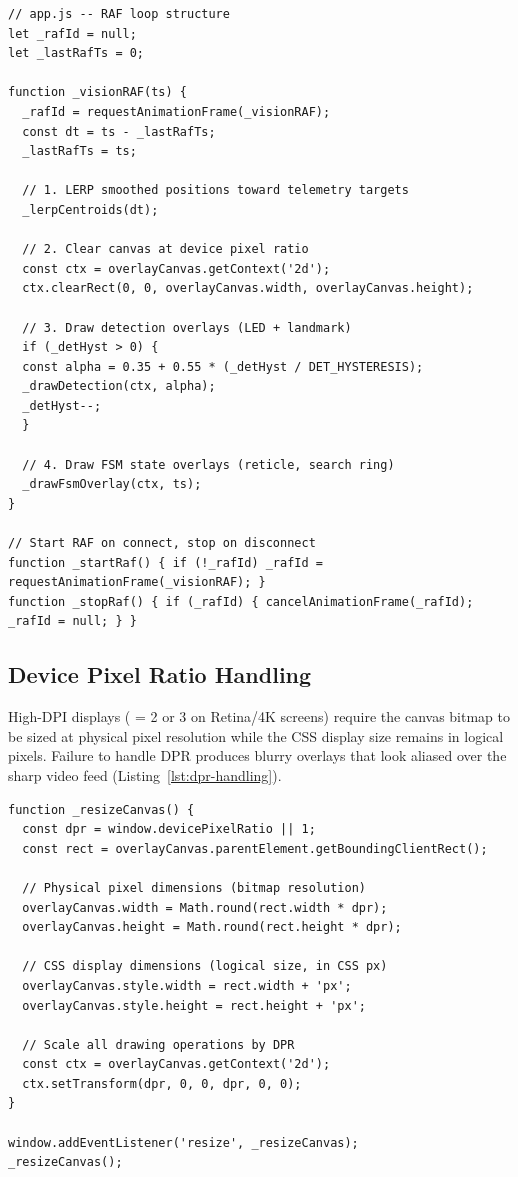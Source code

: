 \begin{lstlisting}[caption={RAF loop structure decoupled from telemetry rate}, label={lst:raf-loop}]
// app.js -- RAF loop structure
let _rafId = null;
let _lastRafTs = 0;

function _visionRAF(ts) {
  _rafId = requestAnimationFrame(_visionRAF);
  const dt = ts - _lastRafTs;
  _lastRafTs = ts;

  // 1. LERP smoothed positions toward telemetry targets
  _lerpCentroids(dt);

  // 2. Clear canvas at device pixel ratio
  const ctx = overlayCanvas.getContext('2d');
  ctx.clearRect(0, 0, overlayCanvas.width, overlayCanvas.height);

  // 3. Draw detection overlays (LED + landmark)
  if (_detHyst > 0) {
  const alpha = 0.35 + 0.55 * (_detHyst / DET_HYSTERESIS);
  _drawDetection(ctx, alpha);
  _detHyst--;
  }

  // 4. Draw FSM state overlays (reticle, search ring)
  _drawFsmOverlay(ctx, ts);
}

// Start RAF on connect, stop on disconnect
function _startRaf() { if (!_rafId) _rafId = requestAnimationFrame(_visionRAF); }
function _stopRaf() { if (_rafId) { cancelAnimationFrame(_rafId); _rafId = null; } }
\end{lstlisting}

\subsection{Device Pixel Ratio Handling}

High-DPI displays ( = 2 or 3 on Retina/4K screens) require the canvas bitmap to be sized at physical pixel resolution while the CSS display size remains in logical pixels. Failure to handle DPR produces blurry overlays that look aliased over the sharp video feed (Listing~\ref{lst:dpr-handling}).

\begin{lstlisting}[caption={Device pixel ratio-aware canvas resizing}, label={lst:dpr-handling}]
function _resizeCanvas() {
  const dpr = window.devicePixelRatio || 1;
  const rect = overlayCanvas.parentElement.getBoundingClientRect();

  // Physical pixel dimensions (bitmap resolution)
  overlayCanvas.width = Math.round(rect.width * dpr);
  overlayCanvas.height = Math.round(rect.height * dpr);

  // CSS display dimensions (logical size, in CSS px)
  overlayCanvas.style.width = rect.width + 'px';
  overlayCanvas.style.height = rect.height + 'px';

  // Scale all drawing operations by DPR
  const ctx = overlayCanvas.getContext('2d');
  ctx.setTransform(dpr, 0, 0, dpr, 0, 0);
}

window.addEventListener('resize', _resizeCanvas);
_resizeCanvas();
\end{lstlisting}

